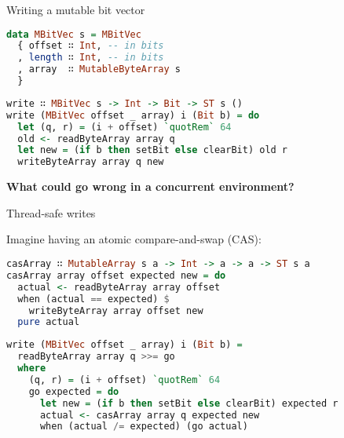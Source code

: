 \documentclass[handout]{beamer}
\begin{document}
\begin{frame}[fragile]{Writing a mutable bit vector}

\begin{lstlisting}[language=Haskell]
data MBitVec s = MBitVec
  { offset ∷ Int, -- in bits
  , length ∷ Int, -- in bits
  , array  ∷ MutableByteArray s
  }
\end{lstlisting}

\pause

\begin{lstlisting}[language=Haskell]
write ∷ MBitVec s -> Int -> Bit -> ST s ()
write (MBitVec offset _ array) i (Bit b) = do
  let (q, r) = (i + offset) `quotRem` 64
  old <- readByteArray array q
  let new = (if b then setBit else clearBit) old r
  writeByteArray array q new
\end{lstlisting}

\pause

\bigskip

\centerline{\bf What could go wrong in a concurrent environment?}

\end{frame}

\begin{frame}[fragile]{Thread-safe writes}

Imagine having an atomic compare-and-swap (CAS):

\begin{lstlisting}[language=Haskell]
casArray ∷ MutableArray s a -> Int -> a -> a -> ST s a
casArray array offset expected new = do
  actual <- readByteArray array offset
  when (actual == expected) $
    writeByteArray array offset new
  pure actual
\end{lstlisting}

\pause

\begin{lstlisting}[language=Haskell]
write (MBitVec offset _ array) i (Bit b) =
  readByteArray array q >>= go
  where
    (q, r) = (i + offset) `quotRem` 64
    go expected = do
      let new = (if b then setBit else clearBit) expected r
      actual <- casArray array q expected new
      when (actual /= expected) (go actual)
\end{lstlisting}

\end{frame}
\end{document}
